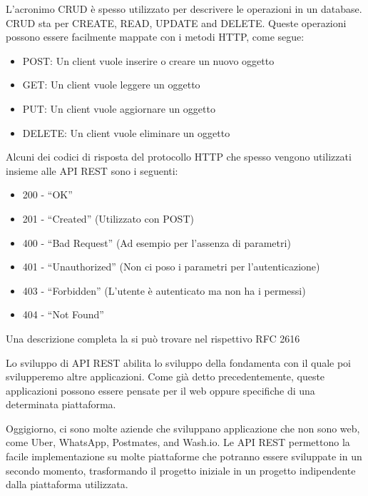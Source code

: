 L'acronimo CRUD è spesso utilizzato per descrivere le operazioni in un database. CRUD sta per CREATE, READ, UPDATE and DELETE. 
Queste operazioni possono essere facilmente mappate con i metodi HTTP, come segue:
\begin{itemize}
\item POST: Un client vuole inserire o creare un nuovo oggetto
\item GET: Un client vuole leggere un oggetto
\item PUT: Un client vuole aggiornare un oggetto
\item DELETE: Un client vuole eliminare un oggetto
\end{itemize}

Alcuni dei codici di risposta del protocollo HTTP che spesso vengono utilizzati insieme alle API REST sono i seguenti:
\begin{itemize}
\item 200 - “OK”
\item 201 - “Created” (Utilizzato con POST)
\item 400 - “Bad Request” (Ad esempio per l'assenza di parametri)
\item 401 - “Unauthorized” (Non ci poso i parametri per l'autenticazione)
\item 403 - “Forbidden” (L'utente è autenticato ma non ha i permessi)
\item 404 - “Not Found”
\end{itemize}
Una descrizione completa la si può trovare nel rispettivo RFC 2616\cite{RFC2616}

Lo sviluppo di API REST abilita lo sviluppo della fondamenta con il quale poi svilupperemo altre applicazioni. 
Come già detto precedentemente, queste applicazioni possono essere pensate per il web oppure specifiche di una determinata piattaforma.

Oggigiorno, ci sono molte aziende che sviluppano applicazione che non sono web, come Uber, WhatsApp, Postmates, and Wash.io. 
Le API REST permettono la facile implementazione su molte piattaforme che potranno essere sviluppate in un secondo momento, trasformando il progetto iniziale in un progetto indipendente dalla piattaforma utilizzata.

